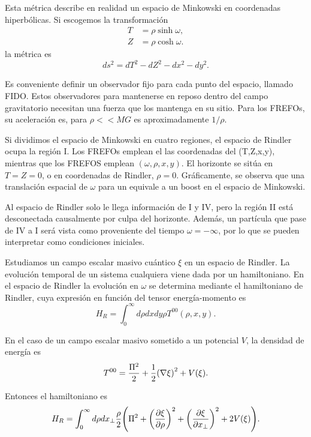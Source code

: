 Esta métrica describe en realidad un espacio de Minkowski en coordenadas hiperbólicas.
Si escogemos la transformación
\begin{align}
  T&=\rho \sinh \omega, \\
  Z&=\rho \cosh \omega.
\end{align}
la métrica es
\begin{equation}
  ds^2=dT^2-dZ^2-dx^2-dy^2.
\end{equation}

Es conveniente definir un observador fijo para cada punto del espacio, llamado
FIDO. Estos observadores para mantenerse
en reposo dentro del campo gravitatorio necesitan una fuerza que los mantenga
en su sitio. Para los FREFOs, su aceleración es, para $\rho<<MG$ es aproximadamente $1/\rho$.

Si dividimos el espacio de Minkowski en cuatro regiones, el espacio de Rindler ocupa
la región I. Los FREFOs emplean el las coordenadas del (T,Z,x,y), mientras que
los FREFOS emplean $(\omega, \rho, x, y)$. El horizonte se sitúa en $T=Z=0$, o
en coordenadas de Rindler, $\rho=0$.
Gráficamente, se observa que una translación espacial de $\omega$ para un equivale
a un boost en el espacio de Minkowski.

Al espacio de Rindler solo le llega información de I y IV, pero la región II está 
desconectada causalmente por culpa del horizonte.
Además, un partícula que pase de IV a I será vista como proveniente del tiempo 
$\omega=-\infty$, por lo que se pueden interpretar como condiciones iniciales.

Estudiamos un campo escalar masivo cuántico $\xi$ en un espacio de Rindler.
La evolución temporal de un sistema cualquiera viene dada por un hamiltoniano. En el
espacio de Rindler la evolución en $\omega$ se determina mediante el hamiltoniano de
Rindler, cuya expresión en función del tensor energía-momento es
\begin{equation}
  H_R=\int_0^\infty d\rho dxdy \rho T^{00} (\rho, x, y).
\end{equation}

En el caso de un campo escalar masivo sometido a un potencial $V$, la densidad de energía
es
\begin{equation}
  T^{00}=\frac{\Pi^2}{2}+\frac{1}{2}\qty(\nabla \xi)^2+V(\xi).
\end{equation}

Entonces el hamiltoniano es
\begin{equation}
  H_R=\int_0^\infty d\rho dx_\perp \frac{\rho}{2}\qty(\Pi^2+\qty(\pdv{\xi}{\rho})^2+\qty(\pdv{\xi}{x_\perp})^2+2V(\xi)).
\end{equation}


